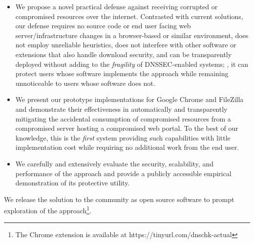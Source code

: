 \begin{itemize}

  \item We propose a novel practical defense against receiving corrupted or
  compromised resources over the internet. Contrasted with current solutions,
  our defense requires no source code or end user facing web
  server/infrastructure changes in a browser-based or similar environment, does
  not employ unreliable heuristics, does not interfere with other software or
  extensions that also handle download security, and can be transparently
  deployed without adding to the \textit{fragility} of DNSSEC-enabled systems;
  \ie, it can protect users whose software implements the \SYSTEM{} approach
  while remaining unnoticeable to users whose software does not.

  \item We present our prototype \SYSTEM{} implementations for Google Chrome and
  FileZilla and demonstrate their effectiveness in automatically and
  transparently mitigating the accidental consumption of compromised resources
  from a compromised server hosting a compromised web portal. To the best of our
  knowledge, this is the \emph{first} system providing such capabilities with
  little implementation cost while requiring no additional work from the end
  user.

  \item We carefully and extensively evaluate the security, scalability, and
  performance of the \SYSTEM{} approach and provide a publicly accessible
  empirical demonstration of its protective utility.

\end{itemize}

We release the \SYSTEM{} solution to the community as open source software to
prompt exploration of the \SYSTEM{} approach\footnote{The \SYSTEM{} Chrome
extension is available at https://tinyurl.com/dnschk-actual}.
